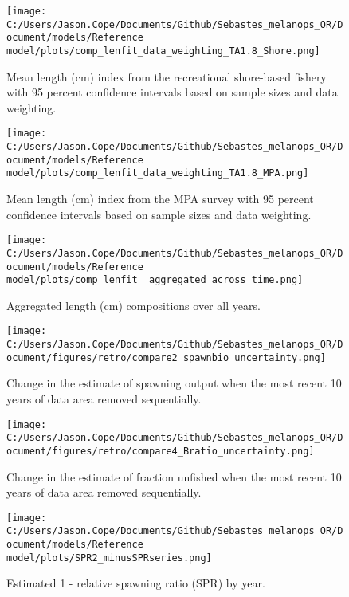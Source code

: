 \documentclass[11pt,
  english,
  letterpaper,
]{article}
\begin{document}
\begin{figure}
\centering
\texttt{[image: C:/Users/Jason.Cope/Documents/Github/Sebastes\_melanops\_OR/Document/models/Reference model/plots/comp\_lenfit\_data\_weighting\_TA1.8\_Shore.png]}
\caption{Mean length (cm) index from the recreational shore-based fishery with 95 percent confidence intervals based on sample sizes and data weighting.\label{fig:shore-mean-len-fit}}
\end{figure}

\begin{figure}
\centering
\texttt{[image: C:/Users/Jason.Cope/Documents/Github/Sebastes\_melanops\_OR/Document/models/Reference model/plots/comp\_lenfit\_data\_weighting\_TA1.8\_MPA.png]}
\caption{Mean length (cm) index from the MPA survey with 95 percent confidence intervals based on sample sizes and data weighting.\label{fig:mpa-mean-len-fit}}
\end{figure}

\begin{figure}
\centering
\texttt{[image: C:/Users/Jason.Cope/Documents/Github/Sebastes\_melanops\_OR/Document/models/Reference model/plots/comp\_lenfit\_\_aggregated\_across\_time.png]}
\caption{Aggregated length (cm) compositions over all years.\label{fig:agg-len-fit}}
\end{figure}

\begin{figure}
\centering
\texttt{[image: C:/Users/Jason.Cope/Documents/Github/Sebastes\_melanops\_OR/Document/figures/retro/compare2\_spawnbio\_uncertainty.png]}
\caption{Change in the estimate of spawning output when the most recent 10 years of data area removed sequentially.\label{fig:retro-ssb}}
\end{figure}

\begin{figure}
\centering
\texttt{[image: C:/Users/Jason.Cope/Documents/Github/Sebastes\_melanops\_OR/Document/figures/retro/compare4\_Bratio\_uncertainty.png]}
\caption{Change in the estimate of fraction unfished when the most recent 10 years of data area removed sequentially.\label{fig:retro-depl}}
\end{figure}

\newpage

\begin{figure}
\centering
\texttt{[image: C:/Users/Jason.Cope/Documents/Github/Sebastes\_melanops\_OR/Document/models/Reference model/plots/SPR2\_minusSPRseries.png]}
\caption{Estimated 1 - relative spawning ratio (SPR) by year.\label{fig:1-spr}}
\end{figure}
\end{document}
